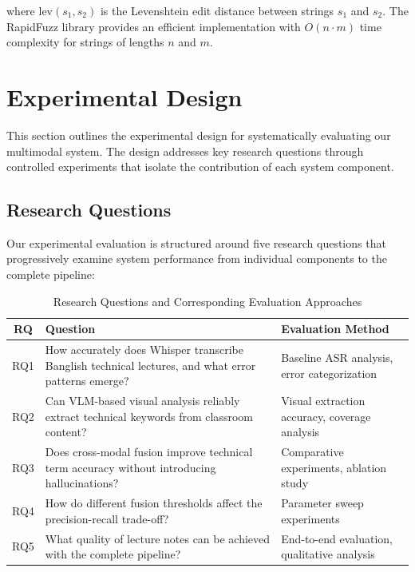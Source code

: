 where $\text{lev}(s_1, s_2)$ is the Levenshtein edit distance between strings $s_1$ and $s_2$. The RapidFuzz library provides an efficient implementation with $O(n \cdot m)$ time complexity for strings of lengths $n$ and $m$.

\section{Experimental Design}
\label{sec:experimental_design}

This section outlines the experimental design for systematically evaluating our multimodal system. The design addresses key research questions through controlled experiments that isolate the contribution of each system component.

\subsection{Research Questions}

Our experimental evaluation is structured around five research questions that progressively examine system performance from individual components to the complete pipeline:

\begin{table}[h]
\centering
\caption{Research Questions and Corresponding Evaluation Approaches}
\label{tab:research_questions}
\begin{tabular}{|c|p{6.5cm}|p{4cm}|}
\hline
\textbf{RQ} & \textbf{Question} & \textbf{Evaluation Method} \\
\hline
RQ1 & How accurately does Whisper transcribe Banglish technical lectures, and what error patterns emerge? & Baseline ASR analysis, error categorization \\
\hline
RQ2 & Can VLM-based visual analysis reliably extract technical keywords from classroom content? & Visual extraction accuracy, coverage analysis \\
\hline
RQ3 & Does cross-modal fusion improve technical term accuracy without introducing hallucinations? & Comparative experiments, ablation study \\
\hline
RQ4 & How do different fusion thresholds affect the precision-recall trade-off? & Parameter sweep experiments \\
\hline
RQ5 & What quality of lecture notes can be achieved with the complete pipeline? & End-to-end evaluation, qualitative analysis \\
\hline
\end{tabular}
\end{table}


